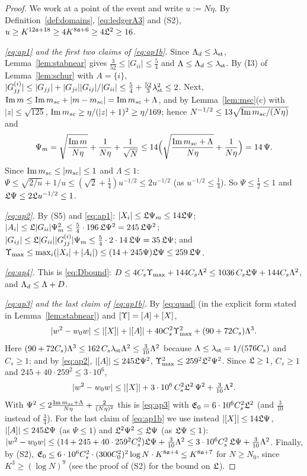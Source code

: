 \begin{proof}
We work at a point of the event and write $u:=N\eta$. By Definition~\ref{def:domains}, \eqref{eq:ledgerA3} and (S2), $u\ge K^{12\mathfrak{a}+18}\ge4K^{8\mathfrak{a}+6}\ge4\mathfrak{L}^2\ge16$.

\emph{\eqref{eq:ap1} and the first two claims of \eqref{eq:ap1b}.} Since $\Lambda_d\le\lambda_{\rm st}$, Lemma~\ref{lem:stabnear} gives $\frac3{52}\le|G_{ii}|\le\frac54$ and $\Lambda\le\Lambda_d\le\lambda_{\rm st}$. By (I3) of Lemma~\ref{lem:schur} with $A=\{i\}$,
$|G^{(i)}_{jj}|\le|G_{jj}|+|G_{ji}||G_{ij}|/|G_{ii}|\le\frac54+\frac{52}3\lambda_{\rm st}^2\le2$. Next, $\operatorname{Im} m\le\operatorname{Im}m_{sc}+|m-m_{sc}|=\operatorname{Im}m_{sc}+\Lambda$, and by Lemma~\ref{lem:msc}(c) with $|z|\le\sqrt{125}$, $\operatorname{Im}m_{sc}\ge\eta/(|z|+1)^2\ge\eta/169$; hence
$N^{-1/2}\le13\sqrt{\operatorname{Im}m_{sc}/(N\eta)}$ and
\[
 \Psi_m=\sqrt{\frac{\operatorname{Im} m}{N\eta}}+\frac1{N\eta}+\frac1{\sqrt N}\le14\Big(\sqrt{\frac{\operatorname{Im}m_{sc}+\Lambda}{N\eta}}+\frac1{N\eta}\Big)=14\,\Psi .
\]
Since $\operatorname{Im}m_{sc}\le|m_{sc}|\le1$ and $\Lambda\le1$: $\Psi\le\sqrt{2/u}+1/u\le(\sqrt2+\frac14)u^{-1/2}\le2u^{-1/2}$ (as $u^{-1/2}\le\frac14$). So $\Psi\le\frac12\le1$ and $\mathfrak{L}\Psi\le2\mathfrak{L} u^{-1/2}\le1$.

\emph{\eqref{eq:ap2}.} By (S5) and \eqref{eq:ap1}: $|X_i|\le\mathfrak{L}\Psi_m\le14\mathfrak{L}\Psi$; $|A_i|\le\mathfrak{L}|G_{ii}|\Psi_m^2\le\frac54\cdot196\,\mathfrak{L}\Psi^2=245\,\mathfrak{L}\Psi^2$; $|G_{ij}|\le\mathfrak{L}|G_{ii}||G^{(i)}_{jj}|\Psi_m\le\frac54\cdot2\cdot14\,\mathfrak{L}\Psi=35\,\mathfrak{L}\Psi$;
and $\Upsilon_{\max}\le\max_i(|X_i|+|A_i|)\le(14+245\Psi)\mathfrak{L}\Psi\le259\,\mathfrak{L}\Psi$.

\emph{\eqref{eq:ap4}.} This is \eqref{eq:Dbound}: $D\le4C_s\Upsilon_{\max}+144C_s\Lambda^2\le1036\,C_s\mathfrak{L}\Psi+144C_s\Lambda^2$, and $\Lambda_d\le\Lambda+D$.

\emph{\eqref{eq:ap3} and the last claim of \eqref{eq:ap1b}.} By \eqref{eq:quad} (in the explicit form stated in Lemma~\ref{lem:stabnear}) and $[\Upsilon]=[A]+[X]$,
\[
 |w^2-w_0w|\le|[X]|+|[A]|+40C_s^2\Upsilon_{\max}^2+(90+72C_s)\Lambda^3 .
\]
Here $(90+72C_s)\Lambda^3\le162\,C_s\lambda_{\rm st}\Lambda^2\le\frac3{10}\Lambda^2$ because $\Lambda\le\lambda_{\rm st}=1/(576C_s)$ and $C_s\ge1$; and by \eqref{eq:ap2}, $|[A]|\le245\mathfrak{L}\Psi^2$, $\Upsilon_{\max}^2\le259^2\mathfrak{L}^2\Psi^2$. Since $\mathfrak{L}\ge1$, $C_s\ge1$ and $245+40\cdot259^2\le3\cdot10^6$,
\[
 |w^2-w_0w|\le|[X]|+3\cdot10^6\,C_s^2\mathfrak{L}^2\,\Psi^2+\tfrac3{10}\Lambda^2 .
\]
With $\Psi^2\le2\frac{\operatorname{Im}m_{sc}+\Lambda}{N\eta}+\frac2{(N\eta)^2}$ this is \eqref{eq:ap3} with $\mathfrak E_0=6\cdot10^6C_s^2\mathfrak{L}^2$ (and $\frac3{10}$ instead of $\frac34$).
For the last claim of \eqref{eq:ap1b} we use instead $|[X]|\le14\mathfrak{L}\Psi$, $|[A]|\le245\mathfrak{L}\Psi$ (as $\Psi\le1$) and $\mathfrak{L}^2\Psi^2\le\mathfrak{L}\Psi$ (as $\mathfrak{L}\Psi\le1$):
$|w^2-w_0w|\le(14+245+40\cdot259^2C_s^2)\mathfrak{L}\Psi+\frac3{10}\Lambda^2\le3\cdot10^6C_s^2\,\mathfrak{L}\Psi+\frac3{10}\Lambda^2$.
Finally, by (S2), $\mathfrak E_0\le6\cdot10^6C_s^2\cdot(300C_0^2)^2\log N\cdot K^{8\mathfrak{a}+4}\le K^{8\mathfrak{a}+7}$ for $N\ge N_0$, since $K^3\ge(\log N)^9$ (see the proof of (S2) for the bound on $\mathfrak{L}$).
\end{proof}

